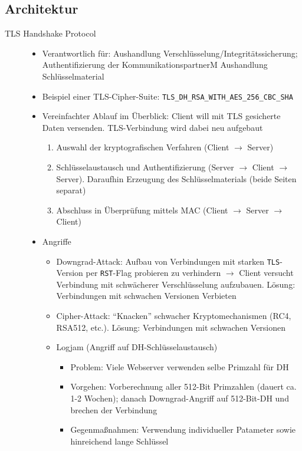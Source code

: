 \subsection{Architektur}
\begin{description}
	\item[TLS Handshake Protocol]\hfill
	\begin{itemize}
		\item Verantwortlich für: Aushandlung Verschlüsselung/Integritätssicherung; Authentifizierung der KommunikationspartnerM Aushandlung Schlüsselmaterial
		\item Beispiel einer TLS-Cipher-Suite: \texttt{TLS\_DH\_RSA\_WITH\_AES\_256\_CBC\_SHA}
		\item Vereinfachter Ablauf im Überblick: Client will mit TLS gesicherte Daten versenden. TLS-Verbindung wird dabei neu aufgebaut
		\begin{enumerate}
			\item Auswahl der kryptografischen Verfahren (Client \(\rightarrow\) Server)
			\item Schlüsselaustausch und Authentifizierung (Server \(\rightarrow\) Client \(\rightarrow\) Server). Daraufhin Erzeugung des Schlüsselmaterials (beide Seiten separat)
			\item Abschluss in Überprüfung mittels MAC (Client \(\rightarrow\) Server \(\rightarrow\) Client)
		\end{enumerate}
		\item Angriffe
		\begin{itemize}
			\item Downgrad-Attack: Aufbau von Verbindungen mit starken \texttt{TLS}-Version per \texttt{RST}-Flag probieren zu verhindern \(\rightarrow\) Client versucht Verbindung mit schwächerer Verschlüsselung aufzubauen. Lösung: Verbindungen mit schwachen Versionen Verbieten
			\item Cipher-Attack: "`Knacken"' schwacher Kryptomechanismen (RC4, RSA512, etc.). Lösung: Verbindungen mit schwachen Versionen
			\item Logjam (Angriff auf DH-Schlüsselaustausch)
			\begin{itemize}
				\item Problem: Viele Webserver verwenden selbe Primzahl für DH
				\item Vorgehen: Vorberechnung aller 512-Bit Primzahlen (dauert ca. 1-2 Wochen); danach Downgrad-Angriff auf 512-Bit-DH und brechen der Verbindung
				\item Gegenmaßnahmen: Verwendung individueller Patameter sowie hinreichend lange Schlüssel

\end{itemize}
\end{itemize}
\end{itemize}
\end{description}
